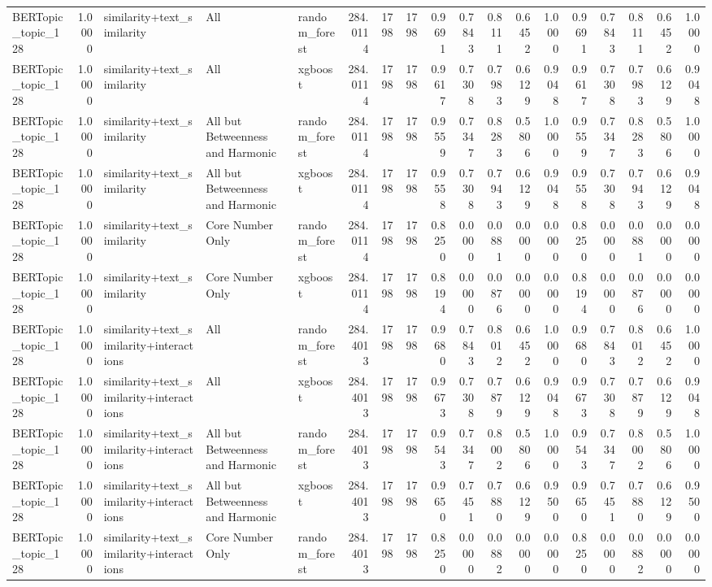 \begin{tabular}{lrlllrrrrrrrrrrrrr}
BERTopic_topic_128 & 1.0000 & similarity+text_similarity & All & random_forest & 284.0114 & 1798 & 1798 & 0.9691 & 0.7843 & 0.8111 & 0.6452 & 1.0000 & 0.9691 & 0.7843 & 0.8111 & 0.6452 & 1.0000 \\
BERTopic_topic_128 & 1.0000 & similarity+text_similarity & All & xgboost & 284.0114 & 1798 & 1798 & 0.9617 & 0.7308 & 0.7983 & 0.6129 & 0.9048 & 0.9617 & 0.7308 & 0.7983 & 0.6129 & 0.9048 \\
BERTopic_topic_128 & 1.0000 & similarity+text_similarity & All but Betweenness and Harmonic & random_forest & 284.0114 & 1798 & 1798 & 0.9559 & 0.7347 & 0.8283 & 0.5806 & 1.0000 & 0.9559 & 0.7347 & 0.8283 & 0.5806 & 1.0000 \\
BERTopic_topic_128 & 1.0000 & similarity+text_similarity & All but Betweenness and Harmonic & xgboost & 284.0114 & 1798 & 1798 & 0.9558 & 0.7308 & 0.7943 & 0.6129 & 0.9048 & 0.9558 & 0.7308 & 0.7943 & 0.6129 & 0.9048 \\
BERTopic_topic_128 & 1.0000 & similarity+text_similarity & Core Number Only & random_forest & 284.0114 & 1798 & 1798 & 0.8250 & 0.0000 & 0.0881 & 0.0000 & 0.0000 & 0.8250 & 0.0000 & 0.0881 & 0.0000 & 0.0000 \\
BERTopic_topic_128 & 1.0000 & similarity+text_similarity & Core Number Only & xgboost & 284.0114 & 1798 & 1798 & 0.8194 & 0.0000 & 0.0876 & 0.0000 & 0.0000 & 0.8194 & 0.0000 & 0.0876 & 0.0000 & 0.0000 \\
BERTopic_topic_128 & 1.0000 & similarity+text_similarity+interactions & All & random_forest & 284.4013 & 1798 & 1798 & 0.9680 & 0.7843 & 0.8012 & 0.6452 & 1.0000 & 0.9680 & 0.7843 & 0.8012 & 0.6452 & 1.0000 \\
BERTopic_topic_128 & 1.0000 & similarity+text_similarity+interactions & All & xgboost & 284.4013 & 1798 & 1798 & 0.9673 & 0.7308 & 0.7879 & 0.6129 & 0.9048 & 0.9673 & 0.7308 & 0.7879 & 0.6129 & 0.9048 \\
BERTopic_topic_128 & 1.0000 & similarity+text_similarity+interactions & All but Betweenness and Harmonic & random_forest & 284.4013 & 1798 & 1798 & 0.9543 & 0.7347 & 0.8002 & 0.5806 & 1.0000 & 0.9543 & 0.7347 & 0.8002 & 0.5806 & 1.0000 \\
BERTopic_topic_128 & 1.0000 & similarity+text_similarity+interactions & All but Betweenness and Harmonic & xgboost & 284.4013 & 1798 & 1798 & 0.9650 & 0.7451 & 0.7880 & 0.6129 & 0.9500 & 0.9650 & 0.7451 & 0.7880 & 0.6129 & 0.9500 \\
BERTopic_topic_128 & 1.0000 & similarity+text_similarity+interactions & Core Number Only & random_forest & 284.4013 & 1798 & 1798 & 0.8250 & 0.0000 & 0.0882 & 0.0000 & 0.0000 & 0.8250 & 0.0000 & 0.0882 & 0.0000 & 0.0000 \\

\end{tabular}
